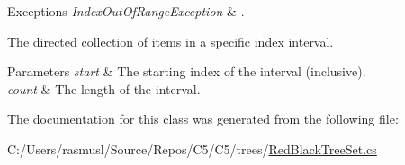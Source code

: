 \begin{DoxyExceptions}{Exceptions}
{\em Index\+Out\+Of\+Range\+Exception} & . \\
\hline
\end{DoxyExceptions}


The directed collection of items in a specific index interval.


\begin{DoxyParams}{Parameters}
{\em start} & The starting index of the interval (inclusive).\\
\hline
{\em count} & The length of the interval.\\
\hline
\end{DoxyParams}


The documentation for this class was generated from the following file\+:\begin{DoxyCompactItemize}
\item 
C\+:/\+Users/rasmusl/\+Source/\+Repos/\+C5/\+C5/trees/\hyperlink{_red_black_tree_set_8cs}{Red\+Black\+Tree\+Set.\+cs}\end{DoxyCompactItemize}

